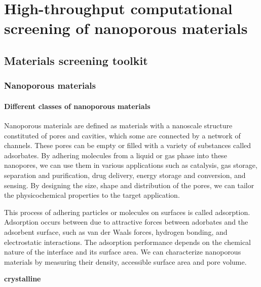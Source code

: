 \documentclass[main.tex]{subfiles}
\begin{document}
\chapter{High-throughput computational screening of nanoporous materials}
\vspace*{-1\baselineskip}


\section{Materials screening toolkit}

\subsection{Nanoporous materials}

\subsubsection{Different classes of nanoporous materials}

Nanoporous materials are defined as materials with a nanoscale structure constituted of pores and cavities, which some are connected by a network of channels. These pores can be empty or filled with a variety of substances called adsorbates. By adhering molecules from a liquid or gas phase into these nanopores, we can use them in various applications such as catalysis, gas storage, separation and purification, drug delivery, energy storage and conversion, and sensing. By designing the size, shape and distribution of the pores, we can tailor the physicochemical properties to the target application.

This process of adhering particles or molecules on surfaces is called adsorption. Adsorption occurs between due to attractive forces between adorbates and the adsorbent surface, such as van der Waals forces, hydrogen bonding, and electrostatic interactions. The adsorption performance depends on the chemical nature of the interface and its surface area. We can characterize nanoporous materials by measuring their density, accessible surface area and pore volume.\cite{Rouquerol_1994} 

\textbf{crystalline}

\end{document}
